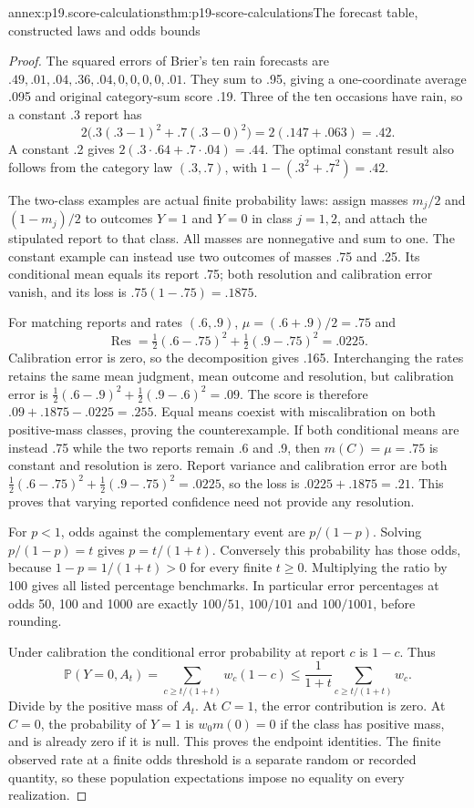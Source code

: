 \begin{annexitem}{annex:p19.score-calculations}{thm:p19-score-calculations}{The forecast table, constructed laws and odds bounds}
\begin{proof}
The squared errors of Brier's ten rain forecasts are
\(.49,.01,.04,.36,.04,0,0,0,0,.01\). They sum to .95, giving a
one-coordinate average .095 and original category-sum score .19.
Three of the ten occasions have rain, so a constant .3 report has
\[
 2\bigl(.3(.3-1)^2+.7(.3-0)^2\bigr)
 =2(.147+.063)=.42.
\]
A constant .2 gives \(2(.3\cdot.64+.7\cdot.04)=.44\). The optimal
constant result also follows from the category law \((.3,.7)\), with
\(1-(.3^2+.7^2)=.42\).

The two-class examples are actual finite probability laws: assign masses
\(m_j/2\) and \((1-m_j)/2\) to outcomes \(Y=1\) and \(Y=0\)
in class \(j=1,2\), and attach the stipulated report to that class.
All masses are nonnegative and sum to one. The constant example can
instead use two outcomes of masses .75 and .25. Its conditional mean
equals its report .75; both resolution and calibration error vanish,
and its loss is \(.75(1-.75)=.1875\).

For matching reports and rates \((.6,.9)\),
\(\mu=(.6+.9)/2=.75\) and
\[
 \operatorname{Res}=\tfrac12(.6-.75)^2+\tfrac12(.9-.75)^2=.0225.
\]
Calibration error is zero, so the decomposition gives .165. Interchanging
the rates retains the same mean judgment, mean outcome and resolution,
but calibration error is
\(\tfrac12(.6-.9)^2+\tfrac12(.9-.6)^2=.09\). The score is
therefore \(.09+.1875-.0225=.255\). Equal means coexist with
miscalibration on both positive-mass classes, proving the counterexample.
If both conditional means are instead .75 while the two reports remain
.6 and .9, then \(m(C)=\mu=.75\) is constant and resolution is zero.
Report variance and calibration error are both
\(\tfrac12(.6-.75)^2+\tfrac12(.9-.75)^2=.0225\), so the loss is
\(.0225+.1875=.21\). This proves that varying reported confidence
need not provide any resolution.

For \(p<1\), odds against the complementary event are \(p/(1-p)\).
Solving \(p/(1-p)=t\) gives \(p=t/(1+t)\). Conversely this probability
has those odds, because \(1-p=1/(1+t)>0\) for every finite \(t\geq0\).
Multiplying the ratio by 100 gives all listed percentage benchmarks.
In particular error percentages at odds 50, 100 and 1000 are exactly
\(100/51\), \(100/101\) and \(100/1001\), before rounding.

Under calibration the conditional error probability at report \(c\) is
\(1-c\). Thus
\[
 \mathbb P(Y=0,A_t)=\sum_{c\geq t/(1+t)}w_c(1-c)
 \leq\frac1{1+t}\sum_{c\geq t/(1+t)}w_c.
\]
Divide by the positive mass of \(A_t\). At \(C=1\), the error
contribution is zero. At \(C=0\), the probability of \(Y=1\) is
\(w_0m(0)=0\) if the class has positive mass, and is already zero
if it is null. This proves the endpoint identities. The finite observed
rate at a finite odds threshold is a separate random or recorded quantity,
so these population expectations impose no equality on every realization.
\end{proof}
\end{annexitem}

